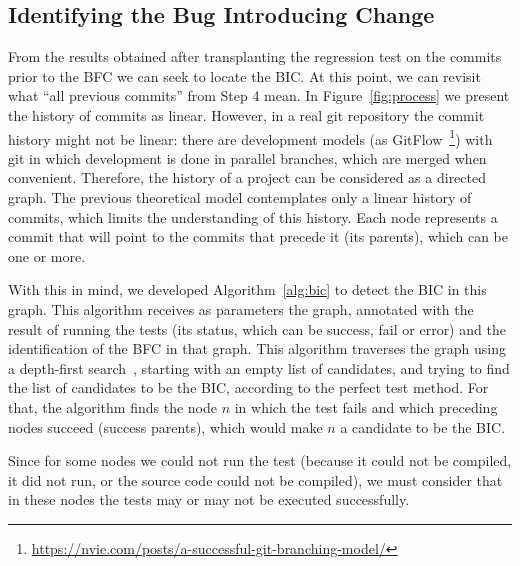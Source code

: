 \subsection{Identifying the Bug Introducing Change}
\label{subsec:identify-bic}

From the results obtained after transplanting the regression test on the commits prior to the BFC we can seek to locate the BIC.
At this point, we can revisit what ``all previous commits'' from Step 4 mean. 
In Figure~\ref{fig:process} we present the history of commits as linear. 
However, in a real git repository the commit history might not be linear: there are development models (as GitFlow~\footnote{\url{https://nvie.com/posts/a-successful-git-branching-model/}}) with git in which development is done in parallel branches, which are merged when convenient. 
Therefore, the history of a project can be considered as a directed graph. 
The previous theoretical model contemplates only a linear history of commits, which limits the understanding of this history.
Each node represents a commit that will point to the commits that precede it (its parents), which can be one or more.

With this in mind, we developed Algorithm~\ref{alg:bic} to detect the BIC in this graph. 
This algorithm receives as parameters the graph, annotated with the result of running the tests (its status, which can be success, fail or error) and the identification of the BFC in that graph. 
This algorithm traverses the graph using a depth-first search~\cite{cormen2022depthfirstsearch}, starting with an empty list of candidates, and trying to find the list of candidates to be the BIC, according to the perfect test method. 
For that, the algorithm finds the node $n$ in which the test fails and which preceding nodes succeed (success parents), which would make $n$ a candidate to be the BIC.

Since for some nodes we could not run the test (because it could not be compiled, it did not run, or the source code could not be compiled), we must consider that in these nodes the tests may or may not be executed successfully.


